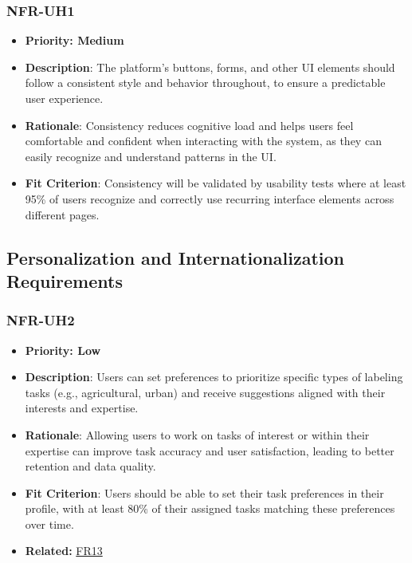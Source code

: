 \documentclass[12pt]{article}
\begin{document}
\subsubsection*{NFR-UH1}
\label{sec:UH1}
      \begin{itemize}
        \item \textbf{Priority: Medium}
          \item \textbf{Description}: The platform’s buttons, forms, and other UI elements should follow a consistent style and behavior throughout, to ensure a predictable user experience.  
          \item \textbf{Rationale}: Consistency reduces cognitive load and helps users feel comfortable and confident when interacting with the system, as they can easily recognize and understand patterns in the UI.  
          \item \textbf{Fit Criterion}: Consistency will be validated by usability tests where at least 95\% of users recognize and correctly use recurring interface elements across different pages.
      \end{itemize}


\subsection{Personalization and Internationalization Requirements}


\subsubsection*{NFR-UH2} 
\label{sec:UH2}
        \begin{itemize}
          \item \textbf{Priority: Low}
            \item \textbf{Description}: Users can set preferences to prioritize specific types of labeling tasks (e.g., agricultural, urban) and receive suggestions aligned with their interests and expertise.  
            \item \textbf{Rationale}: Allowing users to work on tasks of interest or within their expertise can improve task accuracy and user satisfaction, leading to better retention and data quality.  
            \item \textbf{Fit Criterion}: Users should be able to set their task preferences in their profile, with at least 80\% of their assigned tasks matching these preferences over time.
            \item \textbf{Related:} \hyperref[sec:FR13]{FR13}
        \end{itemize}
\end{document}
